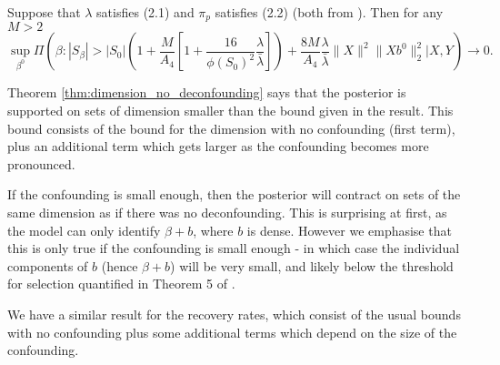 \documentclass[11pt]{article}
\begin{document}
\begin{theorem}\label{thm:dimension_no_deconfounding}
	Suppose that {\color{assumption} $\lambda$ satisfies  (2.1) and $\pi_p$ satisfies (2.2)} (both from \cite{CS-HV2015}). Then for any $M > 2$
$$
	\sup_{\beta^0} \Pi\left(\beta: |S_\beta| > |S_0|\left(1 + \frac{M}{A_4}\left[1 + \frac{16}{\phi(S_0)^2}\frac{\lambda}{\bar{\lambda}} \right]\right)  + \frac{8M}{A_4}\frac{\lambda}{\bar{\lambda}} \|X\|^2\|Xb^0\|_2^2  \big| X, Y \right) \rightarrow 0.
$$
\end{theorem}
Theorem \ref{thm:dimension_no_deconfounding} says that the posterior is supported on sets of dimension smaller than the bound given in the result. This bound consists of the bound for the dimension with no confounding (first term), plus an additional term which gets larger as the confounding becomes more pronounced. 

If the confounding is small enough, then the posterior will contract on sets of the same dimension as if there was no deconfounding. This is surprising at first, as the model can only identify $\beta + b$, where $b$ is dense. However we emphasise that this is only true if the confounding is small enough - in which case the individual components of $b$ (hence $\beta + b$) will be very small, and likely below the threshold for selection quantified in Theorem 5 of \cite{CS-HV2015}. 

We have a similar result for the recovery rates, which consist of the usual bounds with no confounding plus some additional terms which depend on the size of the confounding.
\end{document}
